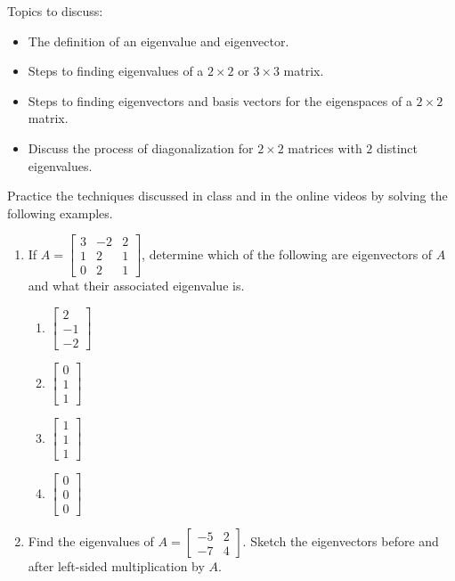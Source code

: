 \documentclass[10pt]{book}
\theoremstyle{definition}
\theoremstyle{remark}
\begin{document}
\begin{large}
\noindent
Topics to discuss:
\begin{itemize}
\item The definition of an eigenvalue and eigenvector. 
\item Steps to finding eigenvalues of a $2\times 2$ or $3 \times 3$ matrix. 
\item Steps to finding eigenvectors and basis vectors for the eigenspaces of a $2\times 2$ matrix.
\item Discuss the process of diagonalization for $2 \times 2$ matrices with $2$ distinct eigenvalues.
\end{itemize}
\newpage

\noindent
Practice the techniques discussed in class and in the online videos by solving the following examples. 
\begin{enumerate}
\item If $A = \begin{bmatrix}3&-2&2\\1&2&1\\0&2&1 \end{bmatrix}$, determine which of the following are eigenvectors of $A$ and what their associated eigenvalue is.
\begin{enumerate}
\item $\begin{bmatrix}2 \\ -1\\ -2 \end{bmatrix}$
\item $\begin{bmatrix}0\\1\\1 \end{bmatrix}$
\item $\begin{bmatrix} 1\\1\\1 \end{bmatrix}$ 
\item $\begin{bmatrix}0\\0\\0 \end{bmatrix}$
\end{enumerate}\vfil

\item Find the eigenvalues of $A = \begin{bmatrix}-5 & 2  \\ -7 & 4 \end{bmatrix}$. Sketch the eigenvectors before and after left-sided multiplication by $A$.\vfil
\newpage


\end{enumerate}
\end{large}
\end{document}
